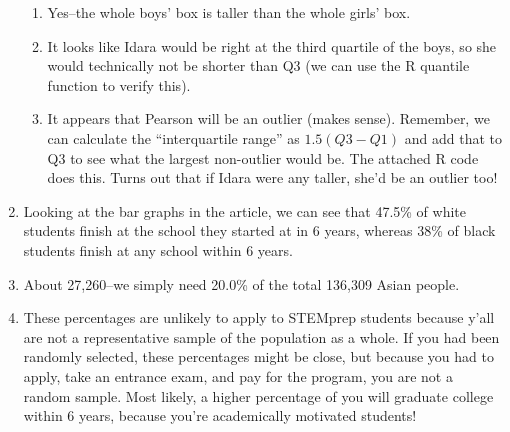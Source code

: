 \documentclass[12pt]{article}
\begin{document}
\begin{enumerate}
\begin{enumerate}
			\item Yes--the whole boys' box is taller than the whole girls' box.
			\item It looks like Idara would be right at the third quartile of the boys, so she would technically not be shorter than Q3 (we can use the R quantile function to verify this).
			\item It appears that Pearson will be an outlier (makes sense). Remember, we can calculate the ``interquartile range'' as $1.5 (Q3 - Q1)$ and add that to Q3 to see what the largest non-outlier would be. The attached R code does this. Turns out that if Idara were any taller, she'd be an outlier too!
	\end{enumerate}
	\item Looking at the bar graphs in the article, we can see that 47.5\% of white students finish at the school they started at in 6 years, whereas 38\% of black students finish at any school within 6 years.
	\item About 27,260--we simply need 20.0\% of the total 136,309 Asian people.
	\item These percentages are unlikely to apply to STEMprep students because y'all are not a representative sample of the population as a whole. If you had been randomly selected, these percentages might be close, but because you had to apply, take an entrance exam, and pay for the program, you are not a random sample. Most likely, a higher percentage of you will graduate college within 6 years, because you're academically motivated students!
\end{enumerate}
\end{document}
